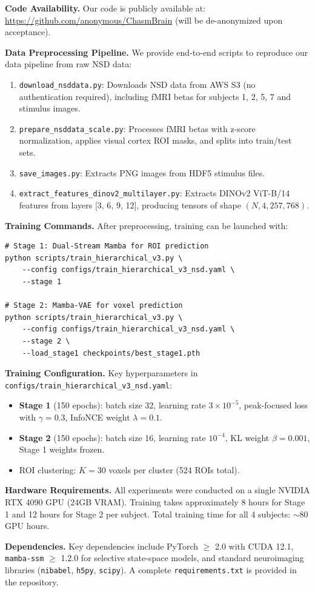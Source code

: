 \textbf{Code Availability.}
Our code is publicly available at: \url{https://github.com/anonymous/ChasmBrain}
(will be de-anonymized upon acceptance).

\textbf{Data Preprocessing Pipeline.}
We provide end-to-end scripts to reproduce our data pipeline from raw NSD data:
\begin{enumerate}
    \item \texttt{download\_nsddata.py}: Downloads NSD data from AWS S3 (no authentication required),
          including fMRI betas for subjects 1, 2, 5, 7 and stimulus images.
    \item \texttt{prepare\_nsddata\_scale.py}: Processes fMRI betas with z-score normalization,
          applies visual cortex ROI masks, and splits into train/test sets.
    \item \texttt{save\_images.py}: Extracts PNG images from HDF5 stimulus files.
    \item \texttt{extract\_features\_dinov2\_multilayer.py}: Extracts DINOv2 ViT-B/14 features
          from layers [3, 6, 9, 12], producing tensors of shape $(N, 4, 257, 768)$.
\end{enumerate}

\textbf{Training Commands.}
After preprocessing, training can be launched with:
\begin{verbatim}
# Stage 1: Dual-Stream Mamba for ROI prediction
python scripts/train_hierarchical_v3.py \
    --config configs/train_hierarchical_v3_nsd.yaml \
    --stage 1

# Stage 2: Mamba-VAE for voxel prediction
python scripts/train_hierarchical_v3.py \
    --config configs/train_hierarchical_v3_nsd.yaml \
    --stage 2 \
    --load_stage1 checkpoints/best_stage1.pth
\end{verbatim}

\textbf{Training Configuration.}
Key hyperparameters in \texttt{configs/train\_hierarchical\_v3\_nsd.yaml}:
\begin{itemize}
    \item \textbf{Stage 1} (150 epochs): batch size 32, learning rate $3 \times 10^{-5}$,
          peak-focused loss with $\gamma = 0.3$, InfoNCE weight $\lambda = 0.1$.
    \item \textbf{Stage 2} (150 epochs): batch size 16, learning rate $10^{-4}$,
          KL weight $\beta = 0.001$, Stage 1 weights frozen.
    \item ROI clustering: $K = 30$ voxels per cluster (524 ROIs total).
\end{itemize}

\textbf{Hardware Requirements.}
All experiments were conducted on a single NVIDIA RTX 4090 GPU (24GB VRAM).
Training takes approximately 8 hours for Stage 1 and 12 hours for Stage 2 per subject.
Total training time for all 4 subjects: $\sim$80 GPU hours.

\textbf{Dependencies.}
Key dependencies include PyTorch $\geq$ 2.0 with CUDA 12.1,
\texttt{mamba-ssm} $\geq$ 1.2.0 for selective state-space models,
and standard neuroimaging libraries (\texttt{nibabel}, \texttt{h5py}, \texttt{scipy}).
A complete \texttt{requirements.txt} is provided in the repository.



